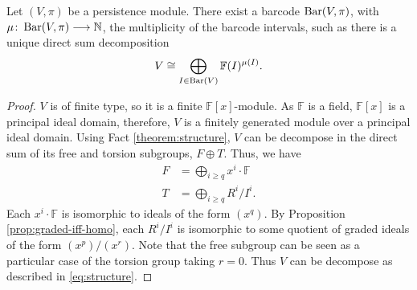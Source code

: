 \begin{theorem}\label{theorem:persistence-structure}
    Let $ (V, \pi) $ be a persistence module. There exist a barcode $ \operatorname{Bar}(V, \pi) $, with $ \mu \colon \operatorname{Bar} (V, \pi) \longrightarrow \mathbb N $, the multiplicity of the barcode intervals, such as there is a unique direct sum decomposition
    \begin{align}
        V \cong \bigoplus_{I \in  \operatorname{Bar} (V)} \mathbb F (I)^{\mu (I)}. \label{eq:structure}
    \end{align}
\end{theorem}
\begin{proof}
    $ V $ is of finite type, so it is a finite $ \mathbb F[x] $-module. As $ \mathbb F $ is a field, $ \mathbb F[x] $ is a principal ideal domain, therefore, $ V $ is a finitely generated module over a principal ideal domain. Using Fact \ref{theorem:structure}, $ V $ can be decompose in the direct sum of its free and torsion subgroups, $ F \oplus T $. Thus, we have
    \begin{align}
        F &= \bigoplus_{i\geq q} x^i \cdot \mathbb F \\
        T &= \bigoplus_{i\geq q} R^i / I^i.
    \end{align}
    Each $ x^i \cdot \mathbb F $ is isomorphic to ideals of the form $ (x^q) $. By Proposition \ref{prop:graded-iff-homo}, each $ R^i / I^i $ is isomorphic to some quotient of graded ideals of the form $ (x^p) / (x^r)$. Note that the free subgroup can be seen as a particular case of the torsion group taking $ r = 0 $. Thus $ V $ can be decompose as described in \eqref{eq:structure}.
\end{proof}
